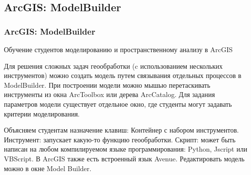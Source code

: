 \documentclass[pdflatex,compress,8pt,
	xcolor={dvipsnames,dvipsnames,svgnames,x11names,table},
	hyperref={	 
	pdfauthor={Lemenkova Polina}, 
	pdfsubject={Preentation}, 
	pdfcreator={Lemenkova Polina}, 
	pdfproducer={Lemenkova Polina}, 
	colorlinks=true,
	linkcolor=Red3, 
	citecolor=NavyBlue, 
	urlcolor = NavyBlue, 
	breaklinks = true}]{beamer}
\begin{document}
\subsection{ArcGIS: ModelBuilder}
\begin{frame}\frametitle{ArcGIS: ModelBuilder}
Обучение студентов моделированию и пространственному анализу в ArcGIS
\small{
\begin{alertblock}{}
Для решения сложных задач геообработки (c использованием нескольких инструментов) можно создать модель путем связывания отдельных процессов в ModelBuilder. При построении модели можно мышью перетаскивать инструменты из окна ArcToolbox или дерева ArcCatalog. Для задания параметров модели существует отдельное окно, где студенты могут задавать критерии моделирования.
\end{alertblock}

\begin{block}{}

Объясняем студентам назначение клавиш: Контейнер с набором инструментов. Инструмент: запускает какую-то функцию геообработки. Скрипт: может быть написан на любом компилируемом языке программирования: Python, Jscript или VBScript. В ArcGIS также есть встроенный язык Avenue. Редактировать модель можно в окне Model Builder.
\end{block}
}
\begin{figure}[H]
	\centering
			\hspace{1mm}
\end{figure}

\end{frame}
\end{document}
